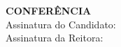 \documentclass[a4paper,12pt]{article}
\begin{document}
        \begin{center}
        \begin{minipage}{0.95\textwidth}
            \centering
            \textbf{CONFERÊNCIA}\\
            \vspace{0.2cm}
            Assinatura do Candidato: \hrulefill \\
            \vspace{0.2cm}
            Assinatura da Reitora: \hrulefill
        \end{minipage}
        \end{center}

        
\end{document}
